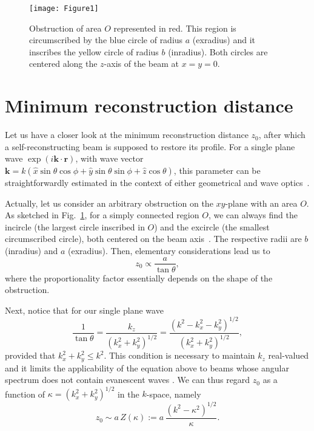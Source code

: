 \documentclass[10pt]{article}
\newcommand{\Vr}{\mathbf{r}}
\newcommand{\vk}{\mathbf{k}}
\begin{document}
\begin{figure}[t]
  \centerline{\texttt{[image: Figure1]}}
  \caption{Obstruction of area $O$ represented in red.  This
    region is circumscribed by the blue circle of radius $a$
    (exradius) and it inscribes the yellow circle of radius $b$
    (inradius).  Both circles are centered along the $z$-axis of the
    beam at $x=y=0$.}
  \label{fig1}
\end{figure}


\section{Minimum reconstruction distance}

Let us have a closer look at the minimum reconstruction distance
$z_{0}$, after which a self-reconstructing beam is supposed to restore
its profile. For a single plane wave $\exp(i \vk \cdot \Vr)$, with
wave vector $\vk = k (\hat{x} \sin \theta \cos \phi + \hat{y} \sin \theta \sin
\phi + \hat{z} \cos \theta)$, this parameter can be straightforwardly
estimated in the context of either geometrical and wave
optics~\cite{Aiello:2014aa}.

Actually, let us consider an arbitrary obstruction on the $xy$-plane
with an area $O$.  As sketched in Fig.~\ref{fig1}, for a simply
connected region $O$, we can always find the incircle (the largest
circle inscribed in $O$) and the excircle (the smallest circumscribed
circle), both centered on the beam axis~\cite{Ball:1992aa}. The respective
radii are $b$ (inradius) and $a$ (exradius).  Then, elementary
considerations lead us to~\cite{McGloin:2005aa,Litvin:2009aa}
\begin{equation}
  \label{z10}
  z_0 \propto \frac{a}{\tan \theta} ,
\end{equation}
where the proportionality factor essentially depends on the shape of
the obstruction.

Next, notice that for our single plane wave
\begin{equation}
  \label{z20}
  \frac{1}{\tan \theta}   =    
  \frac{k_z}{( k_x^2 + k_y^2)^{1/2}} =   
  \frac{( k^2 -  k_x^2 - k_y^2 )^{1/2}}{( k_x^2 + k_y^2 )^{1/2}},
\end{equation}
provided that $ k_x^2 + k_y^2 \leq k^2$. This condition is necessary
to maintain $k_z$ real-valued and it limits the applicability of the
equation above to beams whose angular spectrum does not contain
evanescent waves \cite{Mandel:1995aa}.  We can thus regard
$z_0$ as a function of
$\kappa = (k_x^2 + k_y^2 )^{1/2}$ in the $k$-space, namely
\begin{equation}
\label{z30}
  z_0 \sim a \, Z(\kappa) :=   
  a \, \frac{\left( k^2 - \kappa^2 \right)^{1/2}}{\kappa}.
\end{equation}
\end{document}
